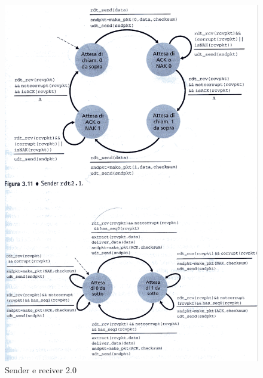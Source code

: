 \documentclass[11pt,a4paper]{article}
\begin{document}
\begin{figure}
		\includegraphics[scale=0.6]{img/019.png}
		\caption{Sender e reciver 2.0}
\end{figure}
\pagebreak
\end{document}
